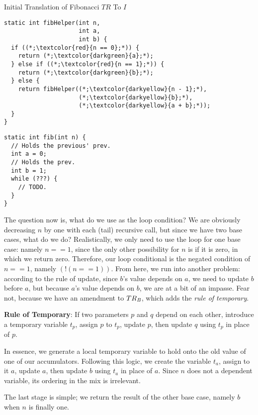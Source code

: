\begin{clrr}[]{Initial Translation of Fibonacci \emph{$TR$} To $I$}
\begin{lstlisting}[language=MyJavaNF]
static int fibHelper(int n, 
                     int a, 
                     int b) {
  if ((*;\textcolor{red}{n == 0};*)) {
    return (*;\textcolor{darkgreen}{a};*);
  } else if ((*;\textcolor{red}{n == 1};*)) {
    return (*;\textcolor{darkgreen}{b};*);
  } else {
    return fibHelper((*;\textcolor{darkyellow}{n - 1};*), 
                     (*;\textcolor{darkyellow}{b};*), 
                     (*;\textcolor{darkyellow}{a + b};*));
  }
}
\end{lstlisting}
\tcblower
\begin{lstlisting}[language=MyJavaNF]
static int fib(int n) {
  // Holds the previous' prev.
  int a = 0;
  // Holds the prev.
  int b = 1;
  while (???) {
    // TODO.
  }
}
\end{lstlisting}
\end{clrr}

The question now is, what do we use as the  loop condition? We are obviously decreasing $n$ by one with each (tail) recursive call, but since we have two base cases, what do we do? Realistically, we only need to use the loop for one base case: namely $n == 1$, since the only other possibility for $n$ is if it is zero, in which we return zero. Therefore, our loop conditional is the negated condition of $n == 1$, namely $(!(n == 1))$. From here, we run into another problem: according to the rule of update, since $b$'s value depends on $a$, we need to update $b$ before $a$, but because $a$'s value depends on $b$, we are at a bit of an impasse. Fear not, because we have an amendment to $TR_\emph{B}$, which adds the \emph{rule of temporary}.

\textbf{Rule of Temporary}: If two parameters $p$ and $q$ depend on each other, introduce a temporary variable $t_p$, assign $p$ to $t_p$, update $p$, then update $q$ using $t_p$ in place of $p$.

In essence, we generate a local temporary variable to hold onto the old value of one of our accumulators. Following this logic, we create the variable $t_a$, assign to it $a$, update $a$, then update $b$ using $t_a$ in place of $a$. Since $n$ does not a dependent variable, its ordering in the mix is irrelevant.

The last stage is simple; we return the result of the other base case, namely $b$ when $n$ is finally one.


